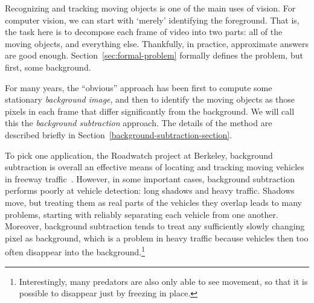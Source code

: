 \newcommand{\secref}[1]{Section~\ref{#1}}
\newcommand{\figref}[1]{Figure~\ref{#1}}
\newcommand{\tabref}[1]{Table~\ref{#1}}
\renewcommand{\eqref}[1]{Equation~(\ref{#1})}

\newcommand{\mbf}[1]{\mbox{{\bf #1}}}
\newcommand{\smbf}[1]{\mbox{{\scriptsize\bf #1}}}
\def\w{\mbf{w}}


Recognizing and tracking moving
objects is one of the main uses of vision.
For computer vision, we can start with `merely' identifying the
foreground.
That is, the task here is to decompose
each frame of video into two parts: all of the moving objects, and
everything else.  Thankfully, in practice, approximate answers are
good enough.  \secref{sec:formal-problem} formally defines the problem,
but first, some background.

For many years, the ``obvious'' approach has
been first to compute some stationary {\em background image}, and then to
identify the moving objects as those pixels in each frame that
differ significantly from the background. We will call this the
{\em background subtraction} approach.
The details of the method are described briefly in
\secref{background-subtraction-section}.

To pick one application, the Roadwatch project at Berkeley,
background subtraction is overall an effective means of
locating and tracking moving vehicles in freeway
traffic~\cite{Koller+al:1994}.
However, in some important cases, background subtraction performs
poorly at vehicle detection: long shadows and heavy traffic.
Shadows move, but treating them as real parts of the vehicles they
overlap leads to many problems, starting with reliably separating each
vehicle from one another.
Moreover, background subtraction tends to treat any
sufficiently slowly changing pixel as
background, which is a problem in heavy traffic because vehicles
then too often disappear into the background.\footnote{Interestingly,
  many predators are also only able to see movement, so that
  it is possible to disappear just by freezing in place.}

